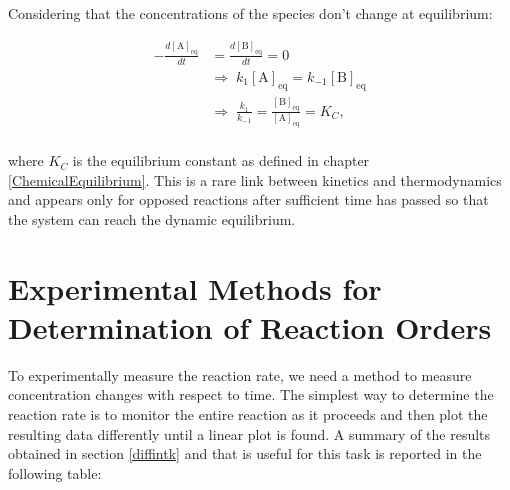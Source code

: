 \documentclass[
  9pt,
]{extbook}
\theoremstyle{definition}
\theoremstyle{definition}
\theoremstyle{definition}
\theoremstyle{definition}
\theoremstyle{remark}
\begin{document}
Considering that the concentrations of the species don't change at equilibrium:

\begin{equation}
\begin{aligned}
-\frac{d[\mathrm{A}]_{\mathrm{eq}}}{dt} &= \frac{d[\mathrm{B}]_{\mathrm{eq}}}{dt} = 0\\
& \Rightarrow \; k_1[\mathrm{A}]_{\mathrm{eq}} = k_{-1}[\mathrm{B}]_{\mathrm{eq}} \\
& \Rightarrow \;  \frac{k_1}{k_{-1}} =  \frac{[\mathrm{B}]_{\mathrm{eq}}}{[\mathrm{A}]_{\mathrm{eq}}} = K_C, \\
\end{aligned}
\label{eq:kinopp4}
\end{equation}

where \(K_C\) is the equilibrium constant as defined in chapter \ref{ChemicalEquilibrium}. This is a rare link between kinetics and thermodynamics and appears only for opposed reactions after sufficient time has passed so that the system can reach the dynamic equilibrium.

\section{Experimental Methods for Determination of Reaction Orders}\label{experimental-methods-for-determination-of-reaction-orders}

To experimentally measure the reaction rate, we need a method to measure concentration changes with respect to time. The simplest way to determine the reaction rate is to monitor the entire reaction as it proceeds and then plot the resulting data differently until a linear plot is found. A summary of the results obtained in section \ref{diffintk} and that is useful for this task is reported in the following table:

\tiny
\end{document}
